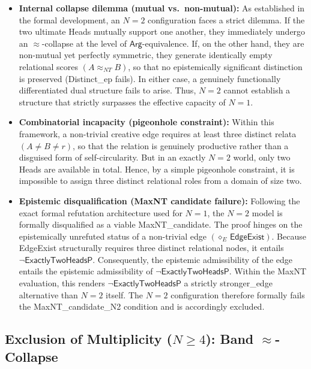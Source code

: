 \documentclass[a4paper, 11pt]{article}
\theoremstyle{plain}
\theoremstyle{definition}
\newcommand{\Arg}{\mathsf{Arg}}           %
\begin{document}
\begin{itemize}
    \item \textbf{Internal collapse dilemma (mutual vs.\ non-mutual):}
    As established in the formal development, an \(N=2\) configuration faces a strict dilemma. If the two ultimate Heads mutually support one another, they immediately undergo an \(\approx\)-collapse at the level of \(\Arg\)-equivalence. If, on the other hand, they are non-mutual yet perfectly symmetric, they generate identically empty relational scores \((A \approx_{NT} B)\), so that no epistemically significant distinction is preserved (\textsf{Distinct\_ep} fails). In either case, a genuinely functionally differentiated dual structure fails to arise. Thus, \(N=2\) cannot establish a structure that strictly surpasses the effective capacity of \(N=1\).

    \item \textbf{Combinatorial incapacity (pigeonhole constraint):}
    Within this framework, a non-trivial creative edge requires at least three distinct relata \((A \neq B \neq r)\), so that the relation is genuinely productive rather than a disguised form of self-circularity. But in an exactly \(N=2\) world, only two Heads are available in total. Hence, by a simple pigeonhole constraint, it is impossible to assign three distinct relational roles from a domain of size two.

    \item \textbf{Epistemic disqualification (MaxNT candidate failure):}
    Following the exact formal refutation architecture used for \(N=1\), the \(N=2\) model is formally disqualified as a viable \textsf{MaxNT\_candidate}. The proof hinges on the epistemically unrefuted status of a non-trivial edge \((\diamond_E\,\textsf{EdgeExist})\). Because \textsf{EdgeExist} structurally requires three distinct relational nodes, it entails \(\neg\textsf{ExactlyTwoHeadsP}\). Consequently, the epistemic admissibility of the edge entails the epistemic admissibility of \(\neg\textsf{ExactlyTwoHeadsP}\). Within the \textsf{MaxNT} evaluation, this renders \(\neg\textsf{ExactlyTwoHeadsP}\) a strictly \textsf{stronger\_edge} alternative than \(N=2\) itself. The \(N=2\) configuration therefore formally fails the \textsf{MaxNT\_candidate\_N2} condition and is accordingly excluded.
\end{itemize}

\subsection{Exclusion of Multiplicity ($N\ge 4$): Band $\approx$-Collapse}
\end{document}
